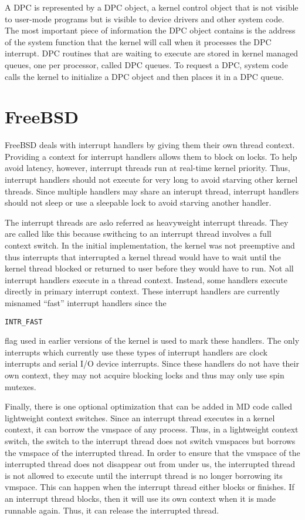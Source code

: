 \documentclass[letterpaper,10pt,draftclsnofoot,onecolumn]{IEEEtran}
\begin{document}
A DPC is represented by a DPC object, a kernel control object that is not visible to user-mode programs but is visible to device drivers and other system code. The most important piece of information the DPC object contains is the address of the system function that the kernel will call when it processes the DPC interrupt. DPC routines that are waiting to execute are stored in kernel managed queues, one per processor, called DPC queues. To request a DPC, system code calls the kernel to initialize a DPC object and then places it in a DPC queue.\cite{[1]}

%
%

\section*{FreeBSD}

FreeBSD deals with interrupt handlers by giving them their own thread context. Providing a context for interrupt handlers allows them to block on locks. To help avoid latency, however, interrupt threads run at real-time kernel priority. Thus, interrupt handlers should not execute for very long to avoid starving other kernel threads. Since multiple handlers may share an interupt thread, interrupt handlers should not sleep or use a sleepable lock to avoid starving another handler.

The interrupt threads are aslo referred as heavyweight interrupt threads. They are called like this because swithcing to an interrupt thread involves a full context switch. In the initial implementation, the kernel was not preemptive and thus interrupts that interrupted a kernel thread would have to wait until the kernel thread blocked or returned to user before they would have to run. Not all interrupt handlers execute in a thread context. Instead, some handlers execute directly in primary interrupt context. These interrupt handlers are currently misnamed “fast” interrupt handlers since the \begin{verbatim}INTR_FAST\end{verbatim} flag used in earlier versions of the kernel is used to mark these handlers. The only interrupts which currently use these types of interrupt handlers are clock interrupts and serial I/O device interrupts. Since these handlers do not have their own context, they may not acquire blocking locks and thus may only use spin mutexes.\cite{[2]}

Finally, there is one optional optimization that can be added in MD code called lightweight context switches. Since an interrupt thread executes in a kernel context, it can borrow the vmspace of any process. Thus, in a lightweight context switch, the switch to the interrupt thread does not switch vmspaces but borrows the vmspace of the interrupted thread. In order to ensure that the vmspace of the interrupted thread does not disappear out from under us, the interrupted thread is not allowed to execute until the interrupt thread is no longer borrowing its vmspace. This can happen when the interrupt thread either blocks or finishes. If an interrupt thread blocks, then it will use its own context when it is made runnable again. Thus, it can release the interrupted thread.
\end{document}
